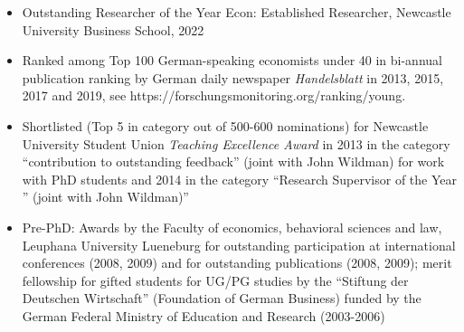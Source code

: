 \documentclass[10pt,pdftex,a4paper,oneside]{article}
\begin{document}
\begin{itemize}
\begin{itemize}[noitemsep,nolistsep]
	\item  Outstanding Researcher of the Year Econ: Established Researcher, Newcastle University Business School, 2022
	\item Ranked among Top 100 German-speaking economists under 40 in bi-annual publication ranking by German daily newspaper \emph{Handelsblatt} in 2013, 2015, 2017 and 2019, see https://forschungsmonitoring.org/ranking/young. 
	\item Shortlisted (Top 5 in category out of 500-600 nominations) for Newcastle University Student Union \emph{Teaching Excellence Award} in 2013 in the category ``contribution to outstanding feedback'' (joint with John Wildman) for work with PhD students and 2014 in the category ``Research Supervisor of the Year '' (joint with John Wildman)''
	\item Pre-PhD: Awards by the Faculty of economics, behavioral sciences and law, Leuphana University Lueneburg for outstanding participation at international conferences (2008, 2009) and for outstanding publications (2008, 2009); merit fellowship for gifted students for UG/PG studies by the ``Stiftung der Deutschen Wirtschaft'' (Foundation of German Business) funded by the German Federal Ministry of Education and Research (2003-2006)
	\end{itemize}
\end{itemize}
\end{document}
